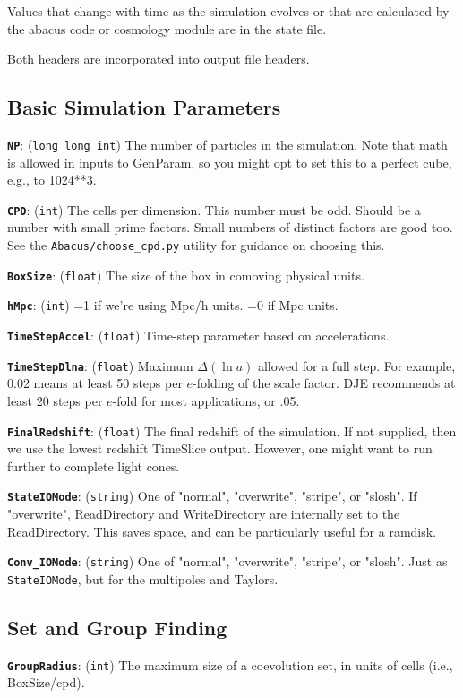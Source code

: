 \documentclass[11pt,preprint]{aastex}
\newcommand{\param}[2]{\medskip\noindent\textbf{\texttt{#1}}: ({\tt #2}) }
\newenvironment{private}{\comment}{\endcomment}
\newenvironment{private}
    {\textbf{Not public:}\\
    \begin{tabular}{|p{0.9\textwidth}|}
    \hline\\
    }
    {
    \\\\\hline
    \end{tabular}
    }
\begin{document}
Values that change with time as the simulation evolves or that are 
calculated by the abacus code or cosmology module are in the state
file.

Both headers are incorporated into output file headers. 

\subsection{Basic Simulation Parameters}

\param{NP}{long long int} The number of particles in the simulation.
Note that math is allowed in inputs to GenParam, so you might opt to
set this to a perfect cube, e.g., to 1024**3.

\param{CPD}{int} The cells per dimension.  This number must be odd.
Should be a number with small prime factors.  Small numbers of distinct factors are good too.
See the \texttt{Abacus/choose\_cpd.py} utility for guidance on choosing this.

\param{BoxSize}{float} The size of the box in comoving physical units.

\param{hMpc}{int} =1 if we're using Mpc/h units.  =0 if Mpc units.

\param{TimeStepAccel}{float} Time-step parameter based on accelerations.

\param{TimeStepDlna}{float} Maximum $\Delta(\ln a)$ allowed for a full step.
For example, 0.02 means at least 50 steps per $e$-folding of the scale factor.
DJE recommends at least 20 steps per $e$-fold for most applications, or .05.

\param{FinalRedshift}{float} The final redshift of the simulation.
If not supplied, then we use the lowest redshift TimeSlice output.
However, one might want to run further to complete light cones.

\param{StateIOMode}{string} One of "normal", "overwrite", "stripe", or "slosh".  If "overwrite", ReadDirectory and WriteDirectory are internally set to the ReadDirectory.
This saves space, and can be particularly useful for a ramdisk.

\param{Conv\_IOMode}{string} One of "normal", "overwrite", "stripe", or "slosh".  Just as \texttt{StateIOMode}, but for the multipoles and Taylors.

\begin{private}
\subsection{Set and Group Finding}

\param{GroupRadius}{int} The maximum size of a coevolution set, 
in units of cells (i.e., BoxSize/cpd).
\end{private}
\end{document}

